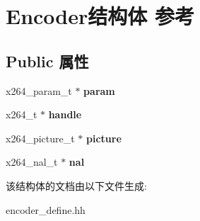 \hypertarget{struct_encoder}{}\section{Encoder结构体 参考}
\label{struct_encoder}
\subsection*{Public 属性}
\begin{DoxyCompactItemize}
\item 
\mbox{\label{struct_encoder_a6844eefdfc8109863dff5db77988de75}} 
x264\+\_\+param\+\_\+t $\ast$ {\bfseries param}
\item 
\mbox{\label{struct_encoder_af5a2b0d4bbbfecf57a4cd357cb8a9e8b}} 
x264\+\_\+t $\ast$ {\bfseries handle}
\item 
\mbox{\label{struct_encoder_a6b79affabf2ca3b4c3b71d79f9e61236}} 
x264\+\_\+picture\+\_\+t $\ast$ {\bfseries picture}
\item 
\mbox{\label{struct_encoder_aae78662ff4e865b3fa87a7e7c5f894c4}} 
x264\+\_\+nal\+\_\+t $\ast$ {\bfseries nal}
\end{DoxyCompactItemize}


该结构体的文档由以下文件生成\+:\begin{DoxyCompactItemize}
\item 
encoder\+\_\+define.\+hh\end{DoxyCompactItemize}
